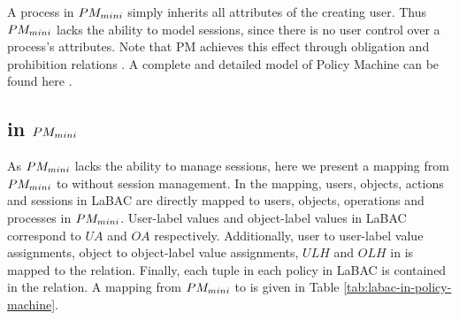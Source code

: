

A process in $PM_{mini}{}$ simply inherits all attributes of the creating user. Thus $PM_{mini}{}$ lacks the ability to model sessions, since there is no user control over a process's attributes.  Note that PM achieves this effect through obligation and prohibition relations \cite{INCITS526}. A complete and detailed model of Policy Machine can be found here \cite{INCITS526,policy-machine}.


 \subsection{\hlabac{} in $PM_{mini}{}$}
 
As $PM_{mini}{}$ lacks the ability to manage sessions, here we present a mapping from $PM_{mini}{}$ to \hlabac{} without session management. In the mapping, users, objects, actions and sessions in LaBAC are directly mapped to users, objects, operations and processes in $PM_{mini}{}$.  User-label values and object-label values in LaBAC correspond to $UA$ and $OA$ respectively. Additionally,  user to user-label value assignments, object to object-label value assignments,  $ULH$ and $OLH$ in \hlabac{} is mapped to the \assignment{} relation. Finally, each tuple in each policy in LaBAC is contained in the \association{} relation. A mapping from  $PM_{mini}{}$ to \hlabac{} is given in Table \ref{tab:labac-in-policy-machine}. 



